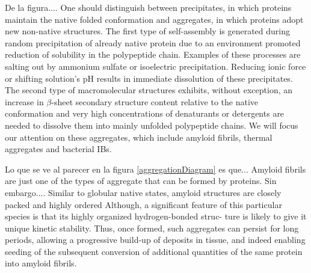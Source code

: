 De la figura....
One should distinguish between precipitates, in which proteins maintain the native folded conformation and aggregates, in which proteins adopt new non-native structures. 
The first type of self-assembly is generated during random precipitation of already native protein due to an environment promoted reduction of solubility in the polypeptide chain. 
Examples of these processes are salting out by ammonium sulfate or isoelectric precipitation. 
Reducing ionic force or shifting solution's pH results in immediate dissolution of these precipitates. 
The second type of macromolecular structures exhibits, without exception, an increase in $\beta$-sheet secondary structure content relative to the native conformation and
very high concentrations of denaturants or detergents are needed to dissolve them into mainly unfolded polypeptide chains. 
We will focus our attention on these aggregates, which include amyloid fibrils, thermal aggregates and bacterial IBs. 











Lo que se ve al parecer en la figura \ref{aggregationDiagram} es que...
Amyloid fibrils are just one of the types of aggregate that
can be formed by proteins.
Sin embargo....
Similar to globular native states, amyloid structures are closely packed and highly ordered
Although, a significant feature of this particular species is that its highly organized hydrogen-bonded struc-
ture is likely to give it unique kinetic stability. Thus, once formed, such aggregates can persist for long periods, allowing a progressive
build-up of deposits in tissue, and indeed enabling seeding of the subsequent conversion of additional quantities of the same protein
into amyloid fibrils.









